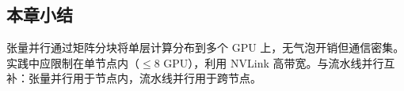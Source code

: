 \subsection{本章小结}

张量并行通过矩阵分块将单层计算分布到多个 GPU 上，无气泡开销但通信密集。实践中应限制在单节点内（$\leq 8$ GPU），利用 NVLink 高带宽。与流水线并行互补：张量并行用于节点内，流水线并行用于跨节点。


